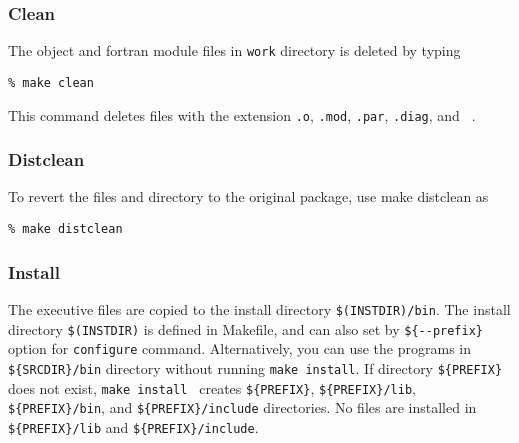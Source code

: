 \subsubsection{Clean}
The object and fortran module files in {\tt work} directory is deleted by typing
\begin{verbatim}
% make clean
\end{verbatim}
This command deletes files with the extension {\tt .o}, {\tt .mod}, {\tt .par}, {\tt .diag}, and {\tt ~}.

\subsubsection{Distclean}
To revert the files and directory to the original package, use make distclean as
\begin{verbatim}
% make distclean
\end{verbatim}


\subsubsection{Install}
 The executive files are copied to the install directory \verb|$(INSTDIR)/bin|. The install directory \verb|$(INSTDIR)| is defined in Makefile, and can also set by  \verb|${--prefix}| option for \verb|configure| command. Alternatively, you can use the programs in \verb|${SRCDIR}/bin| directory without running \verb|make install|. If directory \verb|${PREFIX}| does not exist, \verb|make install | creates  \verb|${PREFIX}|,  \verb|${PREFIX}/lib|,  \verb|${PREFIX}/bin|, and  \verb|${PREFIX}/include| directories. No files are installed in \verb|${PREFIX}/lib| and \verb|${PREFIX}/include|.

